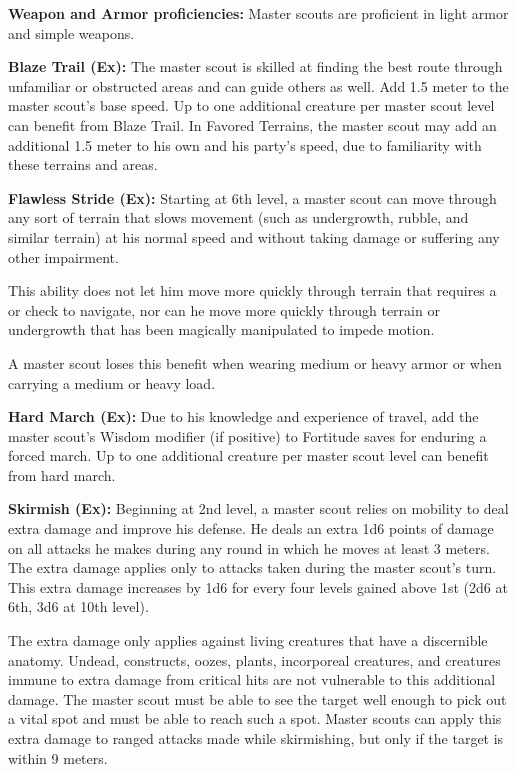{
\textbf{Weapon and Armor proficiencies:} Master scouts are proficient in light armor and simple weapons.

\textbf{Blaze Trail (Ex):} The master scout is skilled at finding the best route through unfamiliar or obstructed areas and can guide others as well. Add 1.5 meter to the master scout's base speed. Up to one additional creature per master scout level can benefit from Blaze Trail. In Favored Terrains, the master scout may add an additional 1.5 meter to his own and his party's speed, due to familiarity with these terrains and areas.

\textbf{Flawless Stride (Ex):} Starting at 6th level, a master scout can move through any sort of terrain that slows movement (such as undergrowth, rubble, and similar terrain) at his normal speed and without taking damage or suffering any other impairment.

This ability does not let him move more quickly through terrain that requires a  or  check to navigate, nor can he move more quickly through terrain or undergrowth that has been magically manipulated to impede motion.

A master scout loses this benefit when wearing medium or heavy armor or when carrying a medium or heavy load.

\textbf{Hard March (Ex):} Due to his knowledge and experience of travel, add the master scout's Wisdom modifier (if positive) to Fortitude saves for enduring a forced march. Up to one additional creature per master scout level can benefit from hard march.

\textbf{Skirmish (Ex):} Beginning at 2nd level, a master scout relies on mobility to deal extra damage and improve his defense. He deals an extra 1d6 points of damage on all attacks he makes during any round in which he moves at least 3 meters. The extra damage applies only to attacks taken during the master scout's turn. This extra damage increases by 1d6 for every four levels gained above 1st (2d6 at 6th, 3d6 at 10th level).

The extra damage only applies against living creatures that have a discernible anatomy. Undead, constructs, oozes, plants, incorporeal creatures, and creatures immune to extra damage from critical hits are not vulnerable to this additional damage. The master scout must be able to see the target well enough to pick out a vital spot and must be able to reach such a spot. Master scouts can apply this extra damage to ranged attacks made while skirmishing, but only if the target is within 9 meters.

}
